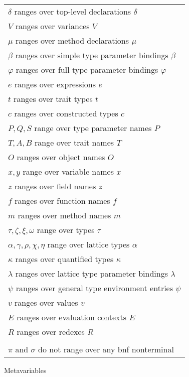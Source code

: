 
\begin{figure}

\begin{tabular}[t]{@{}l@{}}
$\delta$ ranges over top-level declarations $\delta$ \\
$V$ ranges over variances $V$ \\
$\mu$ ranges over method declarations $\mu$ \\
$\beta$ ranges over simple type parameter bindings $\beta$ \\
$\varphi$ ranges over full type parameter bindings $\varphi$ \\
$e$ ranges over expressions $e$ \\
$t$ ranges over trait types $t$ \\
$c$ ranges over constructed types $c$ \\
$P, Q, S$ range over type parameter names $P$ \\
$T, A, B$ range over trait names $T$ \\
$O$ ranges over object names $O$ \\
$x, y$ range over variable names $x$ \\
$z$ ranges over field names $z$ \\
$f$ ranges over function names $f$ \\
$m$ ranges over method names $m$ \\
$\tau, \zeta, \xi, \omega$ range over types $\tau$ \\
$\alpha, \gamma, \rho, \chi, \eta$ range over lattice types $\alpha$ \\
$\kappa$ ranges over quantified types $\kappa$ \\
$\lambda$ ranges over lattice type parameter bindings $\lambda$ \\
$\psi$ ranges over general type environment entries $\psi$ \\
$v$ ranges over values $v$ \\
$E$ ranges over evaluation contexts $E$ \\
$R$ ranges over redexes $R$ \\

 \\[6pt]
$\pi$ and $\sigma$ do not range over any {\sc bnf} nonterminal
\end{tabular}

\caption{Metavariables}
\label{fig:metavariables}
\end{figure}




